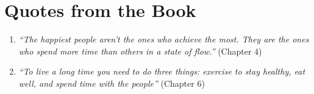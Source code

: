 \section*{Quotes from the Book}
\begin{enumerate}
    \item \emph{``The happiest people aren’t the ones who achieve the most. They are the ones who spend more time than others in a state of flow.''} (Chapter 4)
    \item \emph{``To live a long time you need to do three things: exercise to stay healthy, eat well, and spend time with the people''} (Chapter 6)
\end{enumerate}
